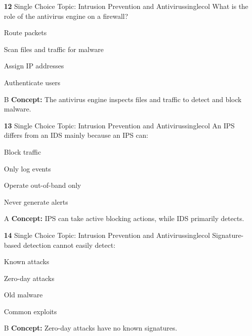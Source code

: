 \documentclass[10pt,a4paper]{article}
\begin{document}
\begin{qcard}{\color{white}\textbf{12} \hfill \small Single Choice \textbar{} Topic: Intrusion Prevention and Antivirus}{singlecol}
What is the role of the antivirus engine on a firewall?

\begin{qoptions}
\item Route packets
\item Scan files and traffic for malware
\item Assign IP addresses
\item Authenticate users
\end{qoptions}
\begin{explainbox}{B}
\textbf{Concept:} The antivirus engine inspects files and traffic to detect and block malware.
\end{explainbox}
\end{qcard}

\begin{qcard}{\color{white}\textbf{13} \hfill \small Single Choice \textbar{} Topic: Intrusion Prevention and Antivirus}{singlecol}
An IPS differs from an IDS mainly because an IPS can:

\begin{qoptions}
\item Block traffic
\item Only log events
\item Operate out-of-band only
\item Never generate alerts
\end{qoptions}
\begin{explainbox}{A}
\textbf{Concept:} IPS can take active blocking actions, while IDS primarily detects.
\end{explainbox}
\end{qcard}

\begin{qcard}{\color{white}\textbf{14} \hfill \small Single Choice \textbar{} Topic: Intrusion Prevention and Antivirus}{singlecol}
Signature-based detection cannot easily detect:

\begin{qoptions}
\item Known attacks
\item Zero-day attacks
\item Old malware
\item Common exploits
\end{qoptions}
\begin{explainbox}{B}
\textbf{Concept:} Zero-day attacks have no known signatures.
\end{explainbox}
\end{qcard}
\end{document}
